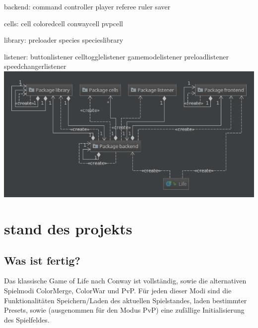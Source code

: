 \documentclass[12pt]{article}
\theoremstyle{plain}
\begin{document}
\begin{linenumbers}
backend:
command
controller
player
referee
ruler
saver

cells:
cell
coloredcell
conwaycell
pvpcell

library:
preloader
species
specieslibrary

listener:
buttonlistener
celltogglelistener
gamemodelistener
preloadlistener
speedchangerlistener
\newline
\includegraphics{images/gogolPackages.png}
\newline

\section{stand des projekts}
\subsection{Was ist fertig?}
Das klassische Game of Life nach Conway ist vollständig, sowie die alternativen Spielmodi ColorMerge, ColorWar und PvP.
Für jeden dieser Modi sind die Funktionalitäten Speichern/Laden des aktuellen Spielstandes, laden bestimmter Presets, sowie (ausgenommen für den Modus PvP) eine zufällige Initialisierung des Spielfeldes.

\end{linenumbers}
\end{document}
